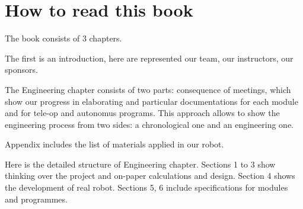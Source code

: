 \section{How to read this book}

The book consists of 3 chapters. \newline
\begin{enumerate*}
    \item The first is an introduction, here are represented our team, our instructors, our sponsors. \newline
    \item The Engineering chapter consists of two parts: consequence of meetings, which show our progress in elaborating and particular documentations for each module and for tele-op and autonomus programs. This approach allows to show the engineering process from two sides: a chronological one and an engineering one. \newline
    
    \item Appendix includes the list of materials applied in our robot. \newline
\end{enumerate*}
	
Here is the detailed structure of Engineering chapter. Sections 1 to 3 show thinking over the project and on-paper calculations and design. Section 4 shows the development of real robot. Sections 5, 6 include specifications for modules and programmes. %
	
\fillpage	